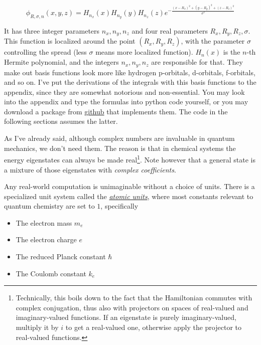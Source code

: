 \documentclass{article}
\newcommand{\githubrepo}{https://github.com/lisyarus/chembook}
\begin{document}
\begin{equation}
\phi_{R,\sigma,n}(x,y,z) = H_{n_x}(x)H_{n_y}(y)H_{n_z}(z) e^{-\frac{(x-R_x)^2+(y-R_y)^2+(z-R_z)^2}{\sigma^2}}
\end{equation}

It has three integer parameters \(n_x,n_y,n_z\) and four real parameters \(R_x,R_y,R_z,\sigma\). This function is localized around the point \((R_x,R_y,R_z)\), with the parameter \(\sigma\) controlling the spread (less \(\sigma\) means more localized function). \(H_n(x)\) is the \(n\)-th Hermite polynomial, and the integers \(n_x,n_y,n_z\) are responsible for that. They make out basis functions look more like hydrogen p-orbitals, d-orbitals, f-orbitals, and so on. I've put the derivations of the integrals with this basis functions to the appendix, since they are somewhat notorious and non-essential. You may look into the appendix and type the formulas into python code yourself, or you may download a package from \href{\githubrepo/blob/master/code/hgto.py}{github} that implements them. The code in the following sections assumes the latter.

As I've already said, although complex numbers are invaluable in quantum mechanics, we don't need them. The reason is that in chemical systems the energy eigenstates can always be made real\footnote{Technically, this boils down to the fact that the Hamiltonian commutes with complex conjugation, thus also with projectors on spaces of real-valued and imaginary-valued functions. If an eigenstate is purely imaginary-valued, multiply it by \(i\) to get a real-valued one, otherwise apply the projector to real-valued functions.}. Note however that a general state is a mixture of those eigenstates with \textit{complex coefficients}.

Any real-world computation is unimaginable without a choice of units. There is a specialized unit system called the \href{https://en.wikipedia.org/wiki/Hartree_atomic_units}{\textit{atomic units}}, where most constants relevant to quantum chemistry are set to \(1\), specifically

\begin{itemize}
\item The electron mass \(m_e\)
\item The electron charge \(e\)
\item The reduced Planck constant \(\hbar\)
\item The Coulomb constant \(k_e\)
\end{itemize}
\end{document}
